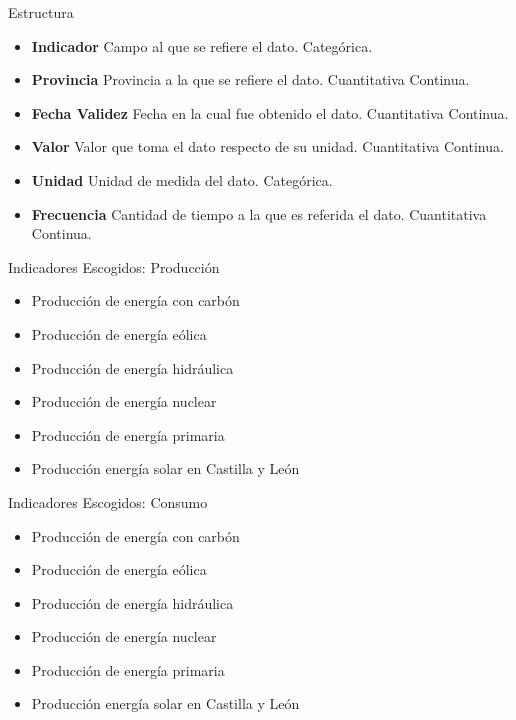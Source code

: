 \documentclass{beamer}
\begin{document}
		\begin{frame}{Estructura}
		
			\begin{itemize}
			
				\item {\bf Indicador } Campo al que se refiere el dato. Categórica.
				
				\item {\bf Provincia } Provincia a la que se refiere el dato. Cuantitativa Continua.
				
				\item {\bf Fecha Validez } Fecha en la cual fue obtenido el dato. Cuantitativa Continua.
				
				\item {\bf Valor } Valor que toma el dato respecto de su unidad. Cuantitativa Continua.
				
				\item {\bf Unidad } Unidad de medida del dato. Categórica.
				
				\item {\bf Frecuencia } Cantidad de tiempo a la que es referida el dato. Cuantitativa Continua.
			\end{itemize}
		
		\end{frame}
		
		\begin{frame}{Indicadores Escogidos: Producción}
		
			\begin{itemize}
				\item Producción de energía con carbón
				\item Producción de energía eólica
				\item Producción de energía hidráulica
				\item Producción de energía nuclear
				\item Producción de energía primaria
				\item Producción energía solar en Castilla y León	
			\end{itemize}
				
		\end{frame}
		
		\begin{frame}{Indicadores Escogidos: Consumo}
		
			\begin{itemize}
				\item Producción de energía con carbón
				\item Producción de energía eólica
				\item Producción de energía hidráulica
				\item Producción de energía nuclear
				\item Producción de energía primaria
				\item Producción energía solar en Castilla y León
			\end{itemize}
							
		\end{frame}
		
\end{document}
